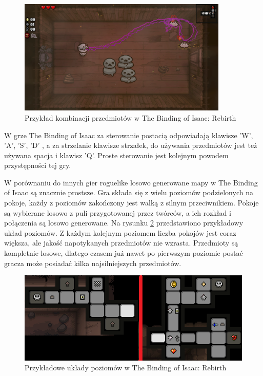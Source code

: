 \documentclass[12pt,twoside]{article}
\begin{document}
\FloatBarrier
\begin{figure}[ht]
	\centering
	\includegraphics[width=10cm]{images/tboi/scr2.png}
	\caption{Przykład kombinacji przedmiotów w The Binding of Isaac: Rebirth}
	\label{tboi:scr2}
\end{figure}
\FloatBarrier

W grze The Binding of Isaac za sterowanie postacią odpowiadają klawisze 'W', 'A', 'S', 'D' , a za strzelanie klawisze strzałek, do używania przedmiotów jest też używana spacja i klawisz 'Q'. Proste sterowanie jest kolejnym powodem przystępności tej gry.

 W porównaniu do innych gier roguelike losowo generowane mapy w The Binding of Isaac są znacznie prostsze. Gra składa się z wielu poziomów podzielonych na pokoje, każdy z poziomów zakończony jest walką z silnym przeciwnikiem. Pokoje są wybierane losowo z puli przygotowanej przez twórców, a ich rozkład i połączenia są losowo generowane. Na rysunku \ref{tboi:scr3} przedstawiono przykładowy układ poziomów. Z każdym kolejnym poziomem liczba pokojów jest coraz większa, ale jakość napotykanych przedmiotów nie wzrasta. Przedmioty są kompletnie losowe, dlatego czasem już nawet po pierwszym poziomie postać gracza może posiadać kilka najsilniejszych przedmiotów. 

\FloatBarrier
\begin{figure}[ht]
	\centering
	\includegraphics[width=12cm]{images/tboi/scr3.png}
	\caption{Przykładowe układy poziomów w The Binding of Isaac: Rebirth}
	\label{tboi:scr3}
\end{figure}
\FloatBarrier
\end{document}
